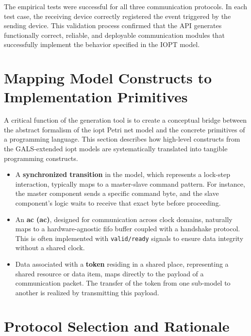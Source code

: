 The empirical tests were successful for all three communication protocols. In each test case, the receiving device correctly registered the event triggered by the sending device. This validation process confirmed that the API generates functionally correct, reliable, and deployable communication modules that successfully implement the behavior specified in the IOPT model.





\section{Mapping Model Constructs to Implementation Primitives}
\label{sec:mapping_constructs}

A critical function of the generation tool is to create a conceptual bridge between the abstract formalism of the \gls{iopt} Petri net model and the concrete primitives of a programming language. This section describes how high-level constructs from the GALS-extended \gls{iopt} models are systematically translated into tangible programming constructs.

\begin{itemize}
    \item A \textbf{synchronized transition} in the model, which represents a lock-step interaction, typically maps to a master-slave command pattern. For instance, the master component sends a specific command byte, and the slave component's logic waits to receive that exact byte before proceeding.
    \item An \textbf{\gls{ac} (\gls{ac})}, designed for communication across clock domains, naturally maps to a hardware-agnostic \gls{fifo} buffer coupled with a handshake protocol. This is often implemented with \texttt{valid/ready} signals to ensure data integrity without a shared clock.
    \item Data associated with a \textbf{token} residing in a shared place, representing a shared resource or data item, maps directly to the payload of a communication packet. The transfer of the token from one sub-model to another is realized by transmitting this payload.
\end{itemize}

\section{Protocol Selection and Rationale}
\label{sec:protocol_rationale}

